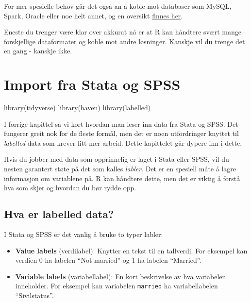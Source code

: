 \documentclass[
  norsk,
  letterpaper,
  DIV=11,
  numbers=noendperiod]{scrreprt}
\newenvironment{Shaded}{\begin{snugshade}}{\end{snugshade}}
\newcommand{\FunctionTok}[1]{\textcolor[rgb]{0.28,0.35,0.67}{#1}}
\newcommand{\NormalTok}[1]{\textcolor[rgb]{0.00,0.23,0.31}{#1}}
\providecommand{\tightlist}{%
  \setlength{\itemsep}{0pt}\setlength{\parskip}{0pt}}
\theoremstyle{definition}
\theoremstyle{remark}
\begin{document}
For mer spesielle behov går det også an å koble mot databaser som MySQL,
Spark, Oracle eller noe helt annet, og en oversikt
\href{https://cran.r-project.org/web/views/Databases.html}{finnes her}.

Eneste du trenger være klar over akkurat nå er at R kan håndtere svært
mange forskjellige dataformater og koble mot andre løsninger. Kanskje
vil du trenge det en gang - kanskje ikke.

\chapter{Import fra Stata og SPSS}\label{import-fra-stata-og-spss}

\begin{Shaded}
\begin{Highlighting}[]
\FunctionTok{library}\NormalTok{(tidyverse)}
\FunctionTok{library}\NormalTok{(haven)}
\FunctionTok{library}\NormalTok{(labelled)}
\end{Highlighting}
\end{Shaded}

I forrige kapittel så vi kort hvordan man leser inn data fra Stata og
SPSS. Det fungerer greit nok for de fleste formål, men det er noen
utfordringer knyttet til \emph{labelled} data som krever litt mer
arbeid. Dette kapittelet går dypere inn i dette.

Hvis du jobber med data som opprinnelig er laget i Stata eller SPSS, vil
du nesten garantert støte på det som kalles \emph{labler}. Det er en
spesiell måte å lagre informasjon om variablene på. R kan håndtere
dette, men det er viktig å forstå hva som skjer og hvordan du bør rydde
opp.

\section{Hva er labelled data?}\label{hva-er-labelled-data}

I Stata og SPSS er det vanlig å bruke to typer labler:

\begin{itemize}
\tightlist
\item
  \textbf{Value labels} (verdilabel): Knytter en tekst til en tallverdi.
  For eksempel kan verdien 0 ha labelen ``Not married'' og 1 ha labelen
  ``Married''.
\item
  \textbf{Variable labels} (variabellabel): En kort beskrivelse av hva
  variabelen inneholder. For eksempel kan variabelen \texttt{married} ha
  variabellabelen ``Sivilstatus''.
\end{itemize}
\end{document}
